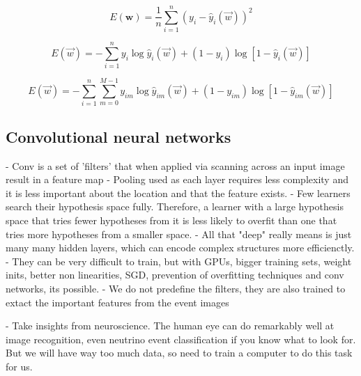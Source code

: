 \begin{equation} %
    E(\boldsymbol{w})=
    \frac{1}{n}\displaystyle\sum_{i=1}^{n}(y_{i}-
    \hat{y}_{i}(\vec{w}))^{2}
    \label{eq:mse}
\end{equation}

\begin{equation} %
    E(\vec{w})=
    -\displaystyle\sum_{i=1}^{n}y_{i}\log\hat{y}_{i}(\vec{w})+
    (1-y_{i})\log[1-\hat{y}_{i}(\vec{w})]
    \label{eq:binary_cross_entropy}
\end{equation}

\begin{equation} %
    E(\vec{w})=
    -\displaystyle\sum_{i=1}^{n}\displaystyle\sum_{m=0}^{M-1}y_{im}\log\hat{y}_{im}
    (\vec{w})+(1-y_{im})\log[1-\hat{y}_{im}(\vec{w})]
    \label{eq:categorical_cross_entropy}
\end{equation}

\subsection{Convolutional neural networks} %
\label{sec:cvn_theory_conv} %

- Conv is a set of 'filters' that when applied via scanning across an input image result in a
feature map
- Pooling used as each layer requires less complexity and it is less important about the location
and that the feature exists.
- Few learners search their hypothesis space fully. Therefore, a learner with a large hypothesis
space that tries fewer hypotheses from it is less likely to overfit than one that tries more
hypotheses from a smaller space.
- All that "deep" really means is just many many hidden layers, which can encode complex
structures more efficienctly.
- They can be very difficult to train, but with GPUs, bigger training sets, weight inits, better
non linearities, SGD, prevention of overfitting techniques and conv networks, its possible.
- We do not predefine the filters, they are also trained to extact the important features from the
event images

- Take insights from neuroscience. The human eye can do remarkably well at image recognition, even
neutrino event classification if you know what to look for. But we will have way too much data, so
need to train a computer to do this task for us.

